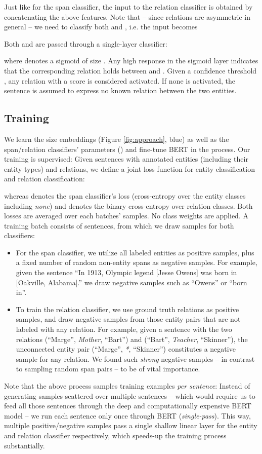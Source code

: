\documentclass{ecai}
\begin{document}
Just like for the span classifier, the input to the relation classifier is obtained by concatenating the above features. Note that -- since relations are  asymmetric in general -- we need to classify both  and , i.e. the input becomes

Both  and  are passed through a single-layer classifier:

where  denotes a sigmoid of size . Any high response in the sigmoid layer indicates that the corresponding relation holds between  and . Given a confidence threshold , any relation with a score  is considered activated. If none is activated, the sentence is assumed to express no known relation between the two entities. 

\subsection{Training}
We learn the size embeddings  (Figure \ref{fig:approach}, blue) as well as the span/relation classifiers' parameters () and fine-tune BERT in the process. Our training is supervised: Given sentences with annotated entities (including their entity types) and relations, we define a joint loss function for entity classification and relation classification:

whereas  denotes the span classifier's loss (cross-entropy over the entity classes including {\it none}) and  denotes the binary cross-entropy over relation classes. Both losses are averaged over each batches' samples. No class weights are applied.
A training batch consists of  sentences, from which we draw samples for both classifiers: \begin{itemize}
    \item For the span classifier, we utilize all labeled entities  as positive samples, plus a fixed number  of random non-entity spans as negative samples. For example, given the sentence \enquote{In 1913, Olympic legend  [Jesse Owens] was born in [Oakville, Alabama].} we draw negative samples such as \enquote{Owens} or \enquote{born in}.
    \item To train the relation classifier, we use ground truth relations as positive samples, and draw  negative samples from those entity pairs  that are not labeled with any relation. For example, given a sentence with the two relations (\enquote{Marge}, \emph{Mother}, \enquote{Bart}) and  (\enquote{Bart}, \emph{Teacher}, \enquote{Skinner}), the unconnected entity pair (\enquote{Marge}, \emph{*}, \enquote{Skinner})  constitutes a negative sample for any relation.
We found such {\it strong} negative samples -- in contrast to sampling random span pairs -- to be of vital importance.
\end{itemize}
Note that the above process samples training examples {\it per sentence}: Instead of generating samples scattered over multiple sentences -- which would require us to feed all those sentences through the deep and computationally expensive BERT model -- 
we run each sentence only once through BERT (\textit{single-pass}). This way, multiple positive/negative samples pass a single shallow linear layer for the entity and relation classifier respectively, which speeds-up the training process substantially. 
\end{document}
